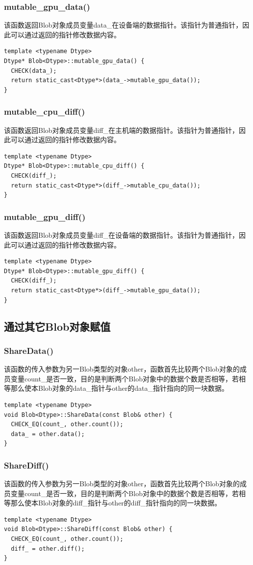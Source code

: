 \subsubsection{mutable\_gpu\_data()}
该函数返回Blob对象成员变量data\_在设备端的数据指针。该指针为普通指针，因此可以通过返回的指针修改数据内容。
\begin{verbatim}
template <typename Dtype>
Dtype* Blob<Dtype>::mutable_gpu_data() {
  CHECK(data_);
  return static_cast<Dtype*>(data_->mutable_gpu_data());
}
\end{verbatim}
\subsubsection{mutable\_cpu\_diff()}
该函数返回Blob对象成员变量diff\_在主机端的数据指针。该指针为普通指针，因此可以通过返回的指针修改数据内容。
\begin{verbatim}
template <typename Dtype>
Dtype* Blob<Dtype>::mutable_cpu_diff() {
  CHECK(diff_);
  return static_cast<Dtype*>(diff_->mutable_cpu_data());
}
\end{verbatim}
\subsubsection{mutable\_gpu\_diff()}
该函数返回Blob对象成员变量diff\_在设备端的数据指针。该指针为普通指针，因此可以通过返回的指针修改数据内容。
\begin{verbatim}
template <typename Dtype>
Dtype* Blob<Dtype>::mutable_gpu_diff() {
  CHECK(diff_);
  return static_cast<Dtype*>(diff_->mutable_gpu_data());
}
\end{verbatim}
\subsection{通过其它Blob对象赋值}
\subsubsection{ShareData()}
该函数的传入参数为另一Blob类型的对象other，函数首先比较两个Blob对象的成员变量count\_是否一致，目的是判断两个Blob对象中的数据个数是否相等，若相等那么使本Blob对象的data\_指针与other的data\_指针指向的同一块数据。
\begin{verbatim}
template <typename Dtype>
void Blob<Dtype>::ShareData(const Blob& other) {
  CHECK_EQ(count_, other.count());
  data_ = other.data();
}
\end{verbatim}
\subsubsection{ShareDiff()}
该函数的传入参数为另一Blob类型的对象other，函数首先比较两个Blob对象的成员变量count\_是否一致，目的是判断两个Blob对象中的数据个数是否相等，若相等那么使本Blob对象的diff\_指针与other的diff\_指针指向的同一块数据。
\begin{verbatim}
template <typename Dtype>
void Blob<Dtype>::ShareDiff(const Blob& other) {
  CHECK_EQ(count_, other.count());
  diff_ = other.diff();
}
\end{verbatim}
